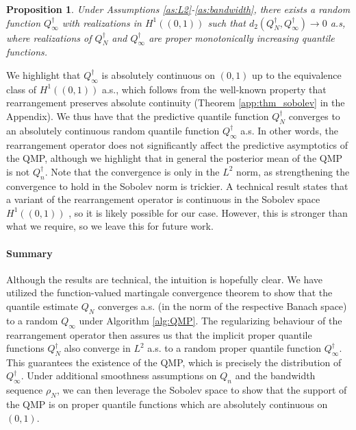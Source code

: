 \documentclass[11pt,a4paper]{article}
\newtheorem{proposition}{Proposition}%
\begin{document}
\begin{proposition}\label{prop:rearr_sobolev}
    Under {Assumptions \ref{as:L2}}-{\ref{as:bandwidth}}, there exists a random function $Q^{\dagger}_\infty$ with realizations in $H^1((0,1))$ such that 
$d_2(Q^{\dagger}_N,Q^{\dagger}_\infty) \to 0$ a.s, where realizations of $Q_N^{\dagger}$ and $Q_\infty^{\dagger}$ are proper monotonically increasing quantile functions. 
\end{proposition}
We highlight that $Q_{\infty}^{\dagger}$  is absolutely continuous on $(0,1)$ up to the equivalence class of $H^1((0,1))$ a.s., which follows from the well-known property that rearrangement preserves absolute continuity ({Theorem \ref{app:thm_sobolev}} in the Appendix).
We thus have that the predictive quantile function $Q_N^{\dagger}$ converges to an absolutely continuous random quantile function $Q_{\infty}^{\dagger}$ a.s. In other words, the rearrangement operator does not significantly affect the  predictive asymptotics of the QMP, although we highlight that in general the posterior mean of the QMP is not $Q_n^{\dagger}$.
Note that the convergence is only in the $L^2$ norm, as strengthening the convergence to hold in the Sobolev norm is trickier. A technical result states that a variant of the rearrangement operator is continuous in the Sobolev space $H^1((0,1))$ \citep{Coron1984,Almgren1989}, so it is likely possible for our case. However, this is stronger than what we require, so we leave this for future work.


\paragraph{\textbf{Summary}}
Although the results are technical, the intuition is hopefully clear.
We have utilized the function-valued martingale convergence theorem to show that the quantile estimate $Q_N$ converges a.s. (in the norm of the respective Banach space) to a random $Q_\infty$ under {Algorithm \ref{alg:QMP}}. The regularizing behaviour of the rearrangement operator then assures us that the {implicit} proper quantile functions $Q_N^{\dagger}$ also converge in $L^2$ a.s. to a random proper quantile function $Q_\infty^{\dagger}$. This guarantees the existence of the QMP, which is precisely the distribution of $Q_\infty^{\dagger}$. 
Under additional smoothness assumptions on $Q_n$ and the bandwidth sequence $\rho_N$, we can then leverage the Sobolev space to show that the support of the QMP is on proper quantile functions which are absolutely continuous on $(0,1)$. 
\end{document}
